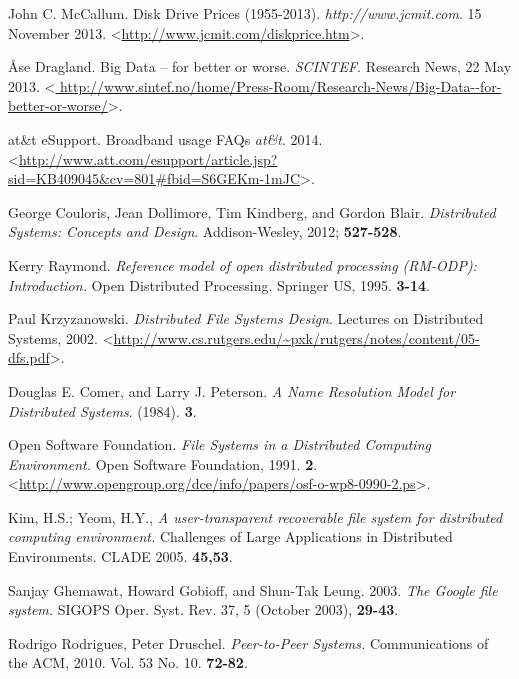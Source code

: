 \documentclass[letterpaper]{article}
\begin{document}
\begin{thebibliography}{99}
John C. McCallum.
Disk Drive Prices (1955-2013). \emph{http://www.jcmit.com}. 15 November 2013. \textless\url{http://www.jcmit.com/diskprice.htm}\textgreater .

Åse Dragland.
Big Data -- for better or worse.
 \emph{SCINTEF}.
Research News, 22 May 2013.
\textless\url{ http://www.sintef.no/home/Press-Room/Research-News/Big-Data--for-better-or-worse/}\textgreater .

at\&t eSupport.
Broadband usage FAQs \emph{at\&t}. 2014.
\textless \url{http://www.att.com/esupport/article.jsp?sid=KB409045&cv=801#fbid=S6GEKm-1mJC}\textgreater.

George Couloris, Jean Dollimore, Tim Kindberg, and Gordon Blair.
\emph{Distributed Systems: Concepts and Design}.
Addison-Wesley, 2012; \textbf{527-528}.

Kerry Raymond. \emph{Reference model of open distributed processing (RM-ODP): Introduction.} Open Distributed Processing. Springer US, 1995. \textbf{3-14}.

Paul Krzyzanowski. \emph{Distributed File Systems Design}. Lectures on Distributed Systems, 2002. \textless\url{http://www.cs.rutgers.edu/~pxk/rutgers/notes/content/05-dfs.pdf}\textgreater .

Douglas E. Comer, and Larry J. Peterson. \emph{A Name Resolution Model for Distributed Systems}. (1984). \textbf{3}.

Open Software Foundation. \emph{File Systems in a Distributed Computing Environment.} Open Software Foundation, 1991. \textbf{2}. \textless\url{http://www.opengroup.org/dce/info/papers/osf-o-wp8-0990-2.ps}\textgreater .

Kim, H.S.; Yeom, H.Y., \emph{A user-transparent recoverable file system for distributed computing environment.} Challenges of Large Applications in Distributed Environments. CLADE 2005. \textbf{45,53}.

Sanjay Ghemawat, Howard Gobioff, and Shun-Tak Leung. 2003. \emph{The Google file system.} SIGOPS Oper. Syst. Rev. 37, 5 (October 2003), \textbf{29-43}.

Rodrigo Rodrigues, Peter Druschel. \emph{Peer-to-Peer Systems.}
Communications of the ACM, 2010. Vol. 53 No. 10. \textbf{72-82}.


\end{thebibliography}
\end{document}
